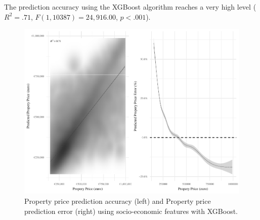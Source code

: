 \documentclass[]{elsarticle} %
\begin{document}
The prediction accuracy using the XGBoost algorithm reaches a very high
level (\(R^2 = .71\), \(F(1, 10387) = 24,916.00\), \(p < .001\)).

\begin{figure}[H]
\includegraphics{property_price_paper_new_files/figure-latex/census-features-xgb-1} \caption{Property price prediction accuracy (left) and Property price prediction error (right) using socio-economic features with XGBoost.}\label{fig:census-features-xgb}
\end{figure}
\end{document}
